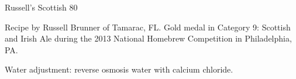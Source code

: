 \begin{recipe}{Russell's Scottish 80} %

\begin{aboutblock}
Recipe by Russell Brunner of Tamarac, FL. Gold medal in Category 9: Scottish
and Irish Ale during the 2013 National Homebrew Competition in Philadelphia, PA.
\sourceaha
\end{aboutblock}


\begin{methodandtiming}

\begin{mashsteps}
\end{mashsteps}

\begin{fermentationsteps}
\end{fermentationsteps}

\begin{directions}
Water adjustment: reverse osmosis water with  calcium chloride.
\end{directions}

\end{methodandtiming}

\recipebreak

\begin{ingredientsblock}

\begin{malts}
\end{malts}

\begin{hops}
\end{hops}


\end{ingredientsblock}

\end{recipe}


